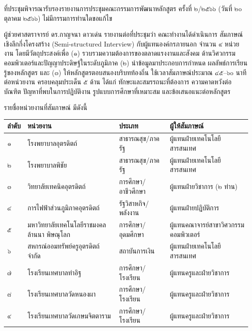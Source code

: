 \documentclass{meetingminutes}
\begin{document}
ที่ประชุมพิจารณารับรองรายงานการประชุมคณะกรรมการพัฒนาหลักสูตร ครั้งที่ ๒/๒๕๖๖
(วันที่ ๒๐ ตุลาคม ๒๕๖๖) ไม่มีกรรมการท่านใดขอแก้ไข



ผู้ช่วยศาสตราจารย์ ดร.กาญจนา ดาวเด่น รายงานต่อที่ประชุมว่า คณะทำงานได้ดำเนินการ
สัมภาษณ์เชิงลึกกึ่งโครงสร้าง (Semi-structured Interview) กับผู้แทนองค์กรภายนอก
จำนวน ๙ หน่วยงาน โดยมีวัตถุประสงค์เพื่อ (๑) รวบรวมความต้องการของตลาดแรงงานและสังคม
ด้านวิศวกรรมคอมพิวเตอร์และปัญญาประดิษฐ์ในระดับภูมิภาค (๒) นำข้อมูลมาประกอบการกำหนด
ผลลัพธ์การเรียนรู้ของหลักสูตร และ (๓) ให้หลักสูตรตอบสนองบริบทท้องถิ่น
ใช้เวลาสัมภาษณ์ประมาณ ๔๕–๖๐ นาทีต่อหน่วยงาน ครอบคลุมประเด็น ๕ ด้าน ได้แก่
ทักษะและสมรรถนะที่ต้องการ ความคาดหวังต่อบัณฑิต ปัญหาที่พบในการปฏิบัติงาน
รูปแบบการศึกษาที่เหมาะสม และข้อเสนอแนะต่อหลักสูตร

\noindent รายชื่อหน่วยงานที่สัมภาษณ์ มีดังนี้

\vspace{6pt}
\noindent\small
\begin{tabularx}{\linewidth}{|>{\centering\arraybackslash}p{0.8cm}|>{\RaggedRight\arraybackslash}X|>{\RaggedRight\arraybackslash}p{3.0cm}|>{\RaggedRight\arraybackslash}X|}
\hline
\bfseries ลำดับ & \bfseries หน่วยงาน & \bfseries ประเภท & \bfseries ผู้ให้สัมภาษณ์ \\
\hline
๑ & โรงพยาบาลอุตรดิตถ์ & สาธารณสุข/ภาครัฐ & ผู้แทนฝ่ายเทคโนโลยีสารสนเทศ \\
\hline
๒ & โรงพยาบาลพิชัย & สาธารณสุข/ภาครัฐ & ผู้แทนฝ่ายเทคโนโลยีสารสนเทศ \\
\hline
๓ & วิทยาลัยเทคนิคอุตรดิตถ์ & การศึกษา/อาชีวศึกษา & ผู้แทนฝ่ายวิชาการ (๒ ท่าน) \\
\hline
๔ & การไฟฟ้าส่วนภูมิภาคอุตรดิตถ์ & รัฐวิสาหกิจ/พลังงาน & ผู้แทนฝ่ายปฏิบัติการ \\
\hline
๕ & มหาวิทยาลัยเทคโนโลยีราชมงคลล้านนา พิษณุโลก & การศึกษา/อุดมศึกษา & ผู้แทนคณาจารย์สาขาวิศวกรรมคอมพิวเตอร์ \\
\hline
๖ & สหกรณ์ออมทรัพย์ครูอุตรดิตถ์ จำกัด & สถาบันการเงิน & ผู้แทนฝ่ายเทคโนโลยีสารสนเทศ \\
\hline
๗ & โรงเรียนเทศบาลท่าอิฐ & การศึกษา/โรงเรียน & ผู้แทนครูและฝ่ายวิชาการ \\
\hline
๘ & โรงเรียนเทศบาลวัดหนองผา & การศึกษา/โรงเรียน & ผู้แทนครูและฝ่ายวิชาการ \\
\hline
๙ & โรงเรียนเทศบาลวัดเกษมจิตตาราม & การศึกษา/โรงเรียน & ผู้แทนครูและฝ่ายวิชาการ \\
\hline
\end{tabularx}
\normalsize
\end{document}
